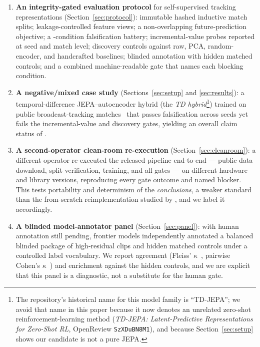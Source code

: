 \documentclass{article}
\begin{document}
\begin{enumerate}
  \item \textbf{An integrity-gated evaluation protocol} for self-supervised
  tracking representations (Section~\ref{sec:protocol}): immutable hashed
  inductive match splits; leakage-controlled feature views; a non-overlapping
  future-prediction objective; a \FalsConditionCount-condition falsification
  battery; incremental-value probes reported at seed and match level; discovery
  controls against raw, PCA, random-encoder, and handcrafted baselines; blinded
  annotation with hidden matched controls; and a combined machine-readable gate
  that names each blocking condition.
  \item \textbf{A negative/mixed case study} (Sections~\ref{sec:setup} and
  \ref{sec:results}): a temporal-difference JEPA--autoencoder hybrid (the
  \emph{TD hybrid}\footnote{The repository's historical name for this model
  family is ``TD-JEPA''; we avoid that name in this paper because it now
  denotes an unrelated zero-shot reinforcement-learning method
  (\emph{TD-JEPA: Latent-Predictive Representations for Zero-Shot RL},
  OpenReview \texttt{SzXDuBN8M1}), and because
  Section~\ref{sec:setup} shows our candidate is not a pure JEPA.}) trained on
  \NumMatches{} public
  broadcast-tracking matches~\citep{skillcorner2020opendata} that passes
  falsification across \NumSeeds{} seeds yet fails the incremental-value and
  discovery gates, yielding an overall claim status of \emph{\GateOverallStatus}.
  \item \textbf{A second-operator clean-room re-execution} (Section~\ref{sec:cleanroom}):
  a different operator re-executed the released pipeline end-to-end --- public
  data download, split verification, training, and all gates --- on different
  hardware and library versions, reproducing every gate outcome and named
  blocker. This tests portability and determinism of the \emph{conclusions},
  a weaker standard than the from-scratch reimplementation studied by
  \citet{raff2019reproducibility}, and we label it accordingly.
  \item \textbf{A blinded model-annotator panel} (Section~\ref{sec:panel}): with
  human annotation still pending, \PanelAnnotatorCount{} frontier models
  independently annotated a balanced blinded package of high-residual clips and
  hidden matched controls under a controlled label vocabulary. We report
  agreement (Fleiss' $\kappa$~\citep{fleiss1971measuring}, pairwise Cohen's
  $\kappa$~\citep{cohen1960coefficient}) and enrichment against the hidden
  controls, and we are explicit that this panel is a diagnostic, not a
  substitute for the human gate.
\end{enumerate}
\end{document}
